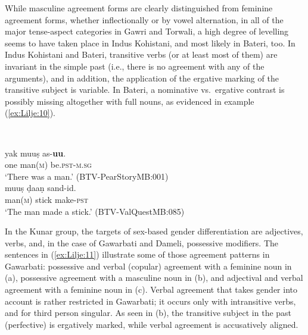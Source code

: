 \documentclass[output=collectionpaper]{langsci/langscibook}
\begin{document}
While masculine agreement forms are clearly distinguished from feminine agreement forms, whether inflectionally or by vowel alternation, in all of the major tense-aspect categories in Gawri and Torwali, a high degree of levelling seems to have taken place in Indus Kohistani, and most likely in Bateri, too. In Indus Kohistani and Bateri, transitive verbs (or at least most of them) are invariant in the simple past (i.e., there is no agreement with any of the arguments), and in addition, the application of the ergative marking of the transitive subject is variable. In Bateri, a nominative vs.\ ergative contrast is possibly missing altogether with full nouns, as evidenced in example (\ref{ex:Lilje:10}).

\ea
\label{ex:Lilje:10}
\\
\begin{xlist}
\ex
\gll yak muuṣ as-\textbf{uu}.     \\
one man(\textsc{m}) be.\textsc{pst-m.sg}     \\
\glt `There was a man.' (BTV-PearStoryMB:001)\\
\ex
\gll muuṣ ḍaaṇ sand{}-id.     \\
man(\textsc{m}) stick make-\textsc{pst}     \\
\glt `The man made a stick.' (BTV-ValQuestMB:085)\\
\end{xlist}
\z

In the Kunar group, the targets of sex-based gender differentiation are adjectives, verbs, and, in the case of Gawarbati and Dameli, possessive modifiers. The sentences in (\ref{ex:Lilje:11}) illustrate some of those agreement patterns in Gawarbati: possessive and verbal (copular) agreement with a feminine noun in (a), possessive agreement with a masculine noun in (b), and adjectival and verbal agreement with a feminine noun in (c). Verbal agreement that takes gender into account is rather restricted in Gawarbati; it occurs only with intransitive verbs, and for third person singular. As seen in (b), the transitive subject in the past (perfective) is ergatively marked, while verbal agreement is accusatively aligned.
\end{document}
